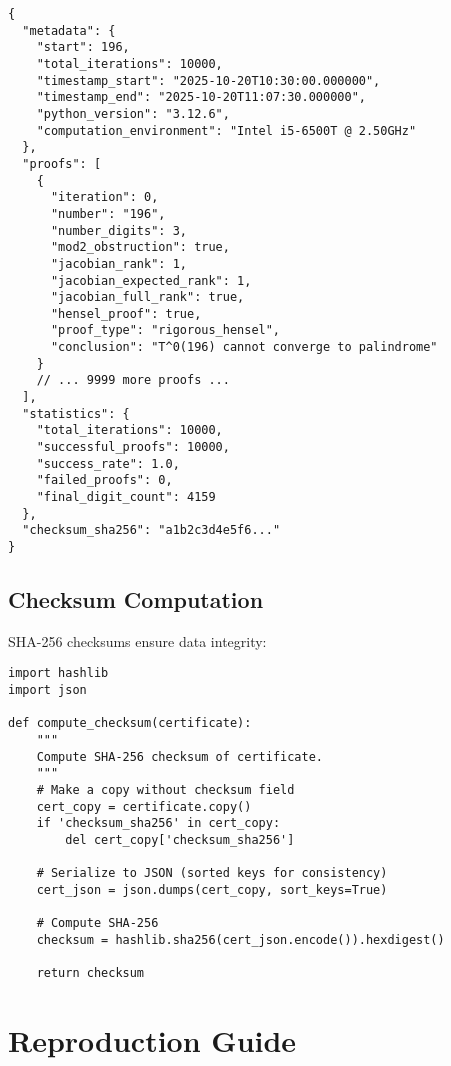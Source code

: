 \documentclass[11pt,a4paper]{article}
\begin{document}
\begin{lstlisting}[style=jsonstyle, caption={Certificate JSON Structure}]
{
  "metadata": {
    "start": 196,
    "total_iterations": 10000,
    "timestamp_start": "2025-10-20T10:30:00.000000",
    "timestamp_end": "2025-10-20T11:07:30.000000",
    "python_version": "3.12.6",
    "computation_environment": "Intel i5-6500T @ 2.50GHz"
  },
  "proofs": [
    {
      "iteration": 0,
      "number": "196",
      "number_digits": 3,
      "mod2_obstruction": true,
      "jacobian_rank": 1,
      "jacobian_expected_rank": 1,
      "jacobian_full_rank": true,
      "hensel_proof": true,
      "proof_type": "rigorous_hensel",
      "conclusion": "T^0(196) cannot converge to palindrome"
    }
    // ... 9999 more proofs ...
  ],
  "statistics": {
    "total_iterations": 10000,
    "successful_proofs": 10000,
    "success_rate": 1.0,
    "failed_proofs": 0,
    "final_digit_count": 4159
  },
  "checksum_sha256": "a1b2c3d4e5f6..."
}
\end{lstlisting}

\subsection{Checksum Computation}

SHA-256 checksums ensure data integrity:

\begin{lstlisting}[style=pythonstyle, caption={Checksum Computation}]
import hashlib
import json

def compute_checksum(certificate):
    """
    Compute SHA-256 checksum of certificate.
    """
    # Make a copy without checksum field
    cert_copy = certificate.copy()
    if 'checksum_sha256' in cert_copy:
        del cert_copy['checksum_sha256']
    
    # Serialize to JSON (sorted keys for consistency)
    cert_json = json.dumps(cert_copy, sort_keys=True)
    
    # Compute SHA-256
    checksum = hashlib.sha256(cert_json.encode()).hexdigest()
    
    return checksum
\end{lstlisting}

\section{Reproduction Guide}
\end{document}

